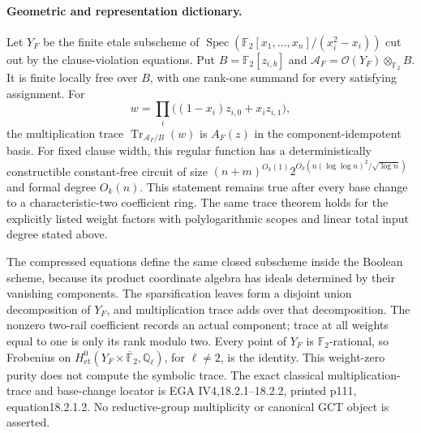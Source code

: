 \paragraph{Geometric and representation dictionary.}
Let $Y_F$ be the finite etale subscheme of $\operatorname{Spec}(\mathbb F_2[x_1,\ldots,x_n]/(x_i^2-x_i))$ cut out by the clause-violation equations. Put $B=\mathbb F_2[z_{i,b}]$ and $\mathscr A_F=\mathcal O(Y_F)\otimes_{\mathbb F_2}B$. It is finite locally free over $B$, with one rank-one summand for every satisfying assignment. For
\[
                           w=\prod_i\bigl((1-x_i)z_{i,0}+x_i z_{i,1}\bigr),
\]
the multiplication trace $\operatorname{Tr}_{\mathscr A_F/B}(w)$ is $A_F(z)$ in the component-idempotent basis. For fixed clause width, this regular function has a deterministically constructible constant-free circuit of size $(n+m)^{O_k(1)}2^{O_k(n(\log\log n)^2/\sqrt{\log n})}$ and formal degree $O_k(n)$. This statement remains true after every base change to a characteristic-two coefficient ring. The same trace theorem holds for the explicitly listed weight factors with polylogarithmic scopes and linear total input degree stated above.

The compressed equations define the same closed subscheme inside the Boolean scheme, because its product coordinate algebra has ideals determined by their vanishing components. The sparsification leaves form a disjoint union decomposition of $Y_F$, and multiplication trace adds over that decomposition. The nonzero two-rail coefficient records an actual component; trace at all weights equal to one is only its rank modulo two. Every point of $Y_F$ is $\mathbb F_2$-rational, so Frobenius on $H^0_{\mathrm{et}}(Y_F\times\overline{\mathbb F}_2,\mathbb Q_\ell)$, for $\ell\ne2$, is the identity. This weight-zero purity does not compute the symbolic trace. The exact classical multiplication-trace and base-change locator is EGA IV4,18.2.1--18.2.2, printed p111, equation18.2.1.2. No reductive-group multiplicity or canonical GCT object is asserted.



